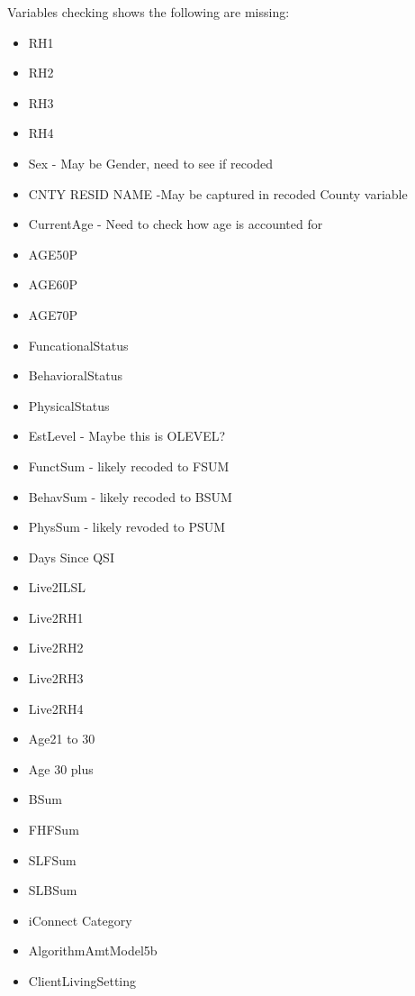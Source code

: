 \documentclass[12pt, letterpaper]{article}
\begin{document}
Variables checking shows the following are missing:\\
\begin{itemize}\\
\noindent \textbf{Possibly already included, or may need to be considered.}
	\item RH1
	\item RH2
	\item RH3
	\item RH4
	\item Sex - May be Gender, need to see if recoded
	\item CNTY RESID NAME -May be captured in recoded County variable
	\item CurrentAge - Need to check how age is accounted for
	\item AGE50P
	\item AGE60P
	\item AGE70P
	\item FuncationalStatus
	\item BehavioralStatus
	\item PhysicalStatus
	\item EstLevel - Maybe this is OLEVEL?
	\item FunctSum - likely recoded to FSUM
	\item BehavSum - likely recoded to BSUM
	\item PhysSum - likely revoded to PSUM
	\item Days Since QSI
	\item Live2ILSL
	\item Live2RH1
	\item Live2RH2
	\item Live2RH3
	\item Live2RH4
	\item Age21 to 30
	\item Age 30 plus
	\item BSum
	\item FHFSum
	\item SLFSum
	\item SLBSum
	\item iConnect Category
	\item AlgorithmAmtModel5b
	\item ClientLivingSetting\\
	

\end{itemize}
\end{document}
